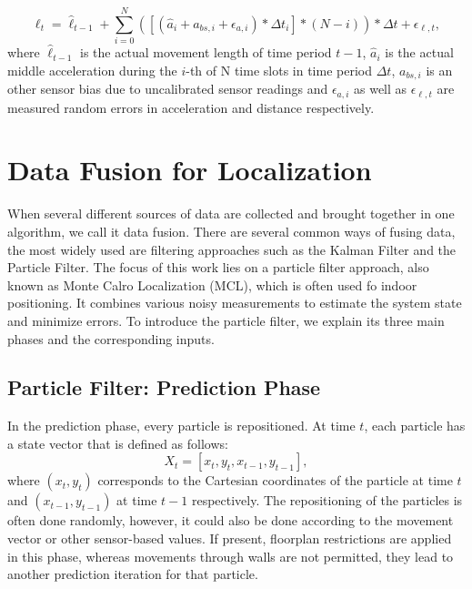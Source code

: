 \begin{equation}
\ell_{t} = \hat{\ell}_{t-1} + \sum_{i=0}^{N}([(\hat{a}_{i} + a_{bs,i} +\epsilon_{a, i}) * \Delta t_{i} ]*(N-i)) *\Delta t + \epsilon_{\ell, t},
\label{eqn:stride_length}
\end{equation}
where $\hat{\ell}_{t-1}$ is the actual movement length of time period $t-1$, $\hat{a}_{i}$ is the actual middle acceleration during the $i$-th of N time slots in time period $\Delta t$, $a_{bs,i}$ is an other sensor bias due to uncalibrated sensor readings and $\epsilon_{a, i}$ as well as $\epsilon_{\ell, t}$ are measured random errors in acceleration and distance respectively.



\section{Data Fusion for Localization}
When several different sources of data are collected and brought together in one algorithm, we call it data fusion. There are several common ways of fusing data, the most widely used are filtering approaches such as the Kalman Filter \cite{Kurt} and the Particle Filter. The focus of this work lies on a particle filter approach, also known as Monte Calro Localization (MCL), which is often used fo indoor positioning. It combines various noisy measurements to estimate the system state and minimize errors. To introduce the particle filter, we explain its three main phases and the corresponding inputs. 

\subsection{Particle Filter: Prediction Phase}
In the prediction phase, every particle is repositioned. At time $t$, each particle has a state vector that is defined as follows:
\begin{equation}
X_{t} = [x_{t}, y_{t}, x_{t-1}, y_{t-1}],
\label{eqn:particles}
\end{equation}
where $(x_{t}, y_{t})$ corresponds to the Cartesian coordinates of the particle at time $t$ and $(x_{t-1}, y_{t-1})$ at time $t-1$ respectively. The repositioning of the particles is often done randomly, however, it could also be done according to the movement vector or other sensor-based values. If present, floorplan restrictions are applied in this phase, whereas movements through walls are not permitted, they lead to another prediction iteration for that particle.

